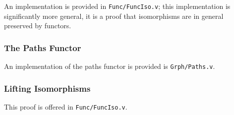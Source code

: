 \documentclass[12pt,twocolumn,oneside]{book}
\begin{document}
An implementation is provided in \texttt{Func/FuncIso.v}; this implementation is
significantly more general, it is a proof that isomorphisms are in general preserved
by functors.


\subsubsection{The Paths Functor}

An implementation of the paths functor is provided is \texttt{Grph/Paths.v}.

\subsubsection{Lifting Isomorphisms}

This proof is offered in \texttt{Func/FuncIso.v}.
\end{document}
